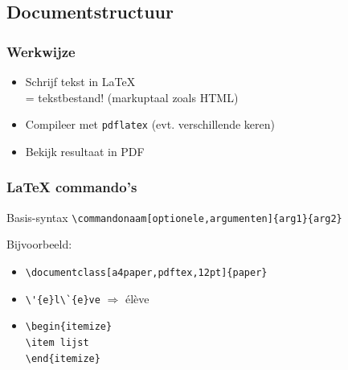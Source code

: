 \documentclass{beamer}
\begin{document}
\subsection{Documentstructuur}

\begin{frame}
  \frametitle{Werkwijze}

  \begin{itemize}
  \item<+-> Schrijf tekst in {\LaTeX}\\
            = tekstbestand! (markuptaal zoals HTML)
  \item<+-> Compileer met \texttt{pdflatex} (evt. verschillende keren)
  \item<+-> Bekijk resultaat in PDF
  \end{itemize}
\end{frame}

\begin{frame}[fragile]
  \frametitle{{\LaTeX} commando's}

  \begin{block}{Basis-syntax}
  \verb|\commandonaam[optionele,argumenten]{arg1}{arg2}|
  \end{block}

  \pause

  Bijvoorbeeld:

  \begin{itemize}
  \item<+-> \verb|\documentclass[a4paper,pdftex,12pt]{paper}|
  \item<+-> \verb|\'{e}l\`{e}ve| $\Rightarrow$ \'el\`eve
  \item<+-> \verb|\begin{itemize}|\\
            \verb|\item lijst|\\
            \verb|\end{itemize}|
  \end{itemize}

\end{frame}
\end{document}
